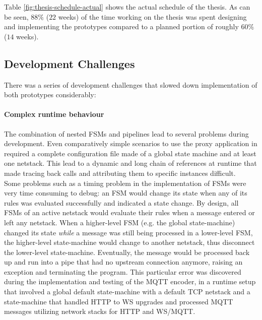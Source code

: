 Table \ref{fig:thesis-schedule-actual} shows the actual schedule of the thesis. As can be seen, $88\%$ ($22$ weeks) of the time working on the thesis was spent designing and implementing the prototypes compared to a planned portion of roughly $60\%$ ($14$ weeks).


\subsection{Development Challenges}
\label{sec:pm-challenges}
There was a series of development challenges that slowed down implementation of both prototypes considerably:
\paragraph{Complex runtime behaviour} The combination of nested \acp{FSM} and pipelines lead to several problems during development. Even comparatively simple scenarios to use the proxy application in required a complete configuration file made of a global state machine and at least one netstack. This lead to a dynamic and long chain of references at runtime that made tracing back calls and attributing them to specific instances difficult.\\
Some problems such as a timing problem in the implementation of \acp{FSM} were very time consuming to debug: an \ac{FSM} would change its state when any of its rules was evaluated successfully and indicated a state change. By design, all \acp{FSM} of an active netstack would evaluate their rules when a message entered or left any netstack. When a higher-level \ac{FSM} (e.g. the global state-machine) changed its state \emph{while} a message was still being processed in a lower-level \ac{FSM}, the higher-level state-machine would change to another netstack, thus disconnect the lower-level state-machine. Eventually, the message would be processed back up and run into a pipe that had no upstream connection anymore, raising an exception and terminating the program. This particular error was discovered during the implementation and testing of the \ac{MQTT} encoder, in a runtime setup that involved a global default state-machine with a default \ac{TCP} netstack and a state-machine that handled \ac{HTTP} to \ac{WS} upgrades and processed \ac{MQTT} messages utilizing network stacks for \ac{HTTP} and \ac{WS}/\ac{MQTT}.\\

